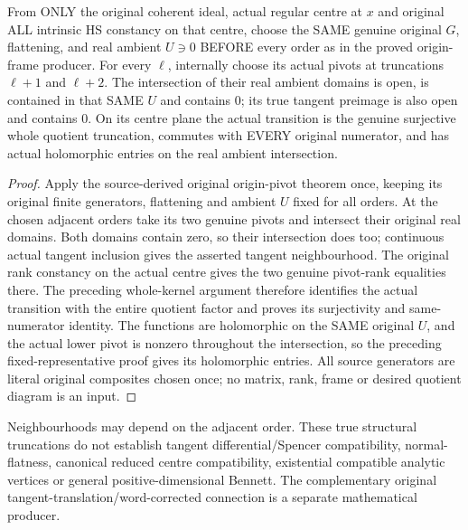 \begin{theorem}
\label{hir:actual-hs-constant-centre-adjacent-order-truncation}
From ONLY the original coherent ideal, actual regular centre at $x$
and original ALL intrinsic HS constancy on that centre, choose the
SAME genuine original $G$, flattening, and real ambient $U\ni0$
BEFORE every order as in the proved origin-frame producer. For every
$\ell$, internally choose its actual pivots at truncations $\ell+1$
and $\ell+2$. The intersection of their real ambient domains is open,
is contained in that SAME $U$ and contains $0$; its true tangent
preimage is also open and contains $0$. On its centre plane the
actual transition is the genuine surjective whole quotient truncation,
commutes with EVERY original numerator, and has actual holomorphic
entries on the real ambient intersection.
\leanok
\end{theorem}
\begin{proof}
Apply the source-derived original origin-pivot theorem once, keeping
its original finite generators, flattening and ambient $U$ fixed for
all orders. At the chosen adjacent orders take its two genuine
pivots and intersect their original real domains. Both domains
contain zero, so their intersection does too; continuous actual
tangent inclusion gives the asserted tangent neighbourhood. The
original rank constancy on the actual centre gives the two genuine
pivot-rank equalities there. The preceding whole-kernel argument
therefore identifies the actual transition with the entire quotient
factor and proves its surjectivity and same-numerator identity.
The functions are holomorphic on the SAME original $U$, and the
actual lower pivot is nonzero throughout the intersection, so the
preceding fixed-representative proof gives its holomorphic entries.
All source generators are literal original composites chosen once;
no matrix, rank, frame or desired quotient diagram is an input.
\end{proof}

Neighbourhoods may depend on the adjacent order. These true structural
truncations do not establish tangent differential/Spencer compatibility,
normal-flatness, canonical reduced centre compatibility, existential
compatible analytic vertices or general positive-dimensional Bennett.
The complementary original tangent-translation/word-corrected connection
is a separate mathematical producer.
